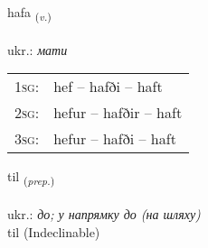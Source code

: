 \documentclass[frontgrid, backgrid]{flacards}\usepackage[]{graphicx}\usepackage[]{xcolor}
\begin{document}
\renewcommand{\blhead}{\vskip5pt {\small\bfseries\footnotesize Sagnorð | дієслово }}
\renewcommand{\bcfoot}{\vskip5pt \hspace{2pt}{\small\bfseries\footnotesize 1K}}


{hafa \small{\textsubscript{(\textit{v.})}} \\[1ex] %
\textphonetic{[haːva]} \\
ukr.: \emph{мати} \\  [2ex]
\renewcommand*{\arraystretch}{0.8}
\begin{tabular}{p{1cm}l}
\textsc{1sg}: & hef -- hafði -- haft \\ 
\textsc{2sg}: & hefur -- hafðir -- haft \\ 
\textsc{3sg}: & hefur -- hafði -- haft \\ 
\end{tabular}
}


\renewcommand{\flhead}{\vskip5pt \fboxsep=0pt {\small\bfseries\footnotesize Forsetning | прийменник}}
\renewcommand{\fcfoot}{\vskip5pt \fboxsep=0pt \hspace{2pt}{\small\bfseries\footnotesize 1K}}

\renewcommand{\blhead}{\vskip5pt {\small\bfseries\footnotesize Forsetning | прийменник }}
\renewcommand{\bcfoot}{\vskip5pt \hspace{2pt}{\small\bfseries\footnotesize 1K}}


{til \small{\textsubscript{(\textit{prep.})}} \\[1ex]
\textphonetic{[tʰɪːl]} \\
ukr.: \emph{до; у напрямку до (на шляху)} \\  [2ex]
til (Indeclinable)}

\renewcommand{\flhead}{\vskip5pt \fboxsep=0pt {\small\bfseries\footnotesize Fornafn | займенник}}
\renewcommand{\fcfoot}{\vskip5pt \fboxsep=0pt \hspace{2pt}{\small\bfseries\footnotesize 1K}}
\end{document}
